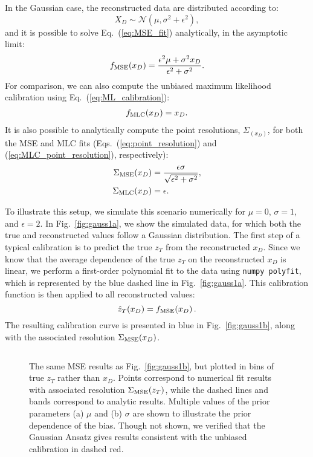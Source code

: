 \documentclass[aps,prd,reprint,preprintnumbers,superscriptaddress,nofootinbib,longbibliography,floatfix]{revtex4-1}
\DeclareRobustCommand{\Fig}[1]{Fig.~\ref{fig:#1}}
\DeclareRobustCommand{\Eq}[1]{Eq.~(\ref{eq:#1})}
\DeclareRobustCommand{\Eqs}[2]{Eqs.~(\ref{eq:#1}) and (\ref{eq:#2})}
\begin{document}
In the Gaussian case, the reconstructed data are distributed according to:
%
\begin{equation}
    X_D\sim\mathcal{N}(\mu,\sigma^2+\epsilon^2),
\end{equation}
%
and it is possible to solve \Eq{MSE_fit} analytically, in the asymptotic limit:
%
\begin{align}
    f_{\rm MSE}(x_D) = \frac{\epsilon^2\mu + \sigma^2 x_D}{\epsilon^2 + \sigma^2}.
\end{align}
%
For comparison, we can also compute the unbiased maximum likelihood calibration using \Eq{ML_calibration}:
\begin{align}
    f_{\rm MLC}(x_D) = x_D.
\end{align}
%
It is also possible to analytically compute the point resolutions, $\Sigma_(x_D)$, for both the MSE and MLC fits (\Eqs{point_resolution}{MLC_point_resolution}, respectively):
%
\begin{align}
    \Sigma_{\rm MSE}(x_D) &= \frac{\epsilon\sigma}{\sqrt{\epsilon^2 + \sigma^2}},  \\
    \Sigma_{\rm MLC}(x_D) &=  \epsilon.
\end{align}

To illustrate this setup, we simulate this scenario numerically for $\mu=0$, $\sigma=1$, and $\epsilon=2$.
%
In \Fig{gauss1a}, we show the simulated data, for which both the true and reconstructed values follow a Gaussian distribution.
%
The first step of a typical calibration is to predict the true $z_T$ from the reconstructed $x_D$.
%
Since we know that the average dependence of the true $z_T$ on the reconstructed $x_D$ is linear, we perform a first-order polynomial fit to the data using \texttt{numpy polyfit}, which is represented by the blue dashed line in \Fig{gauss1a}.
%
This calibration function is then applied to all reconstructed values:
%
\begin{equation}
    \hat{z}_T(x_D) = f_{\rm MSE}(x_D)\,.
\end{equation}
%
The resulting calibration curve is presented in blue in \Fig{gauss1b}, along with the associated resolution $\Sigma_{\rm MSE}(x_D)$.

\begin{figure*}[t]
    \centering
    $\qquad$
    \caption{The same MSE results as \Fig{gauss1b}, but plotted in bins of true $z_T$ rather than $x_D$. Points correspond to numerical fit results with associated resolution $\Sigma_{\rm MSE}(z_T)$, while the dashed lines and bands correspond to analytic results. Multiple values of the prior parameters (a) $\mu$ and (b) $\sigma$ are shown to illustrate the prior dependence of the bias.  Though not shown, we verified that the Gaussian Ansatz gives results consistent with the unbiased calibration in dashed red.}
    \label{fig:gauss2}
\end{figure*}
\end{document}
